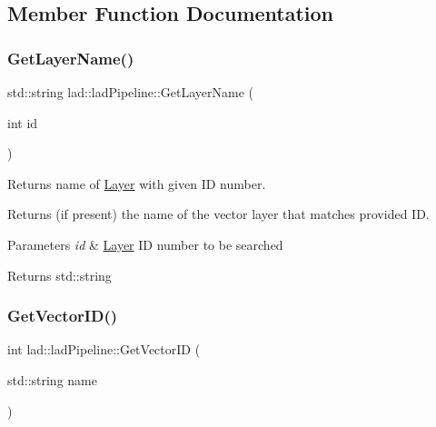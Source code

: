 \subsection{Member Function Documentation}
\mbox{\label{classlad_1_1lad_pipeline_a10c0af216e3004e054d351b9f517408b}} 
\subsubsection{\texorpdfstring{Get\+Layer\+Name()}{GetLayerName()}}
{\footnotesize\ttfamily std\+::string lad\+::lad\+Pipeline\+::\+Get\+Layer\+Name (\begin{DoxyParamCaption}\item[{int}]{id }\end{DoxyParamCaption})}



Returns name of \hyperlink{classlad_1_1_layer}{Layer} with given ID number. 

Returns (if present) the name of the vector layer that matches provided ID.


\begin{DoxyParams}{Parameters}
{\em id} & \hyperlink{classlad_1_1_layer}{Layer} ID number to be searched \\
\hline
\end{DoxyParams}
\begin{DoxyReturn}{Returns}
std\+::string 
\end{DoxyReturn}
\mbox{\label{classlad_1_1lad_pipeline_a6e4748a05ef0346e1912118496931523}} 
\subsubsection{\texorpdfstring{Get\+Vector\+I\+D()}{GetVectorID()}}
{\footnotesize\ttfamily int lad\+::lad\+Pipeline\+::\+Get\+Vector\+ID (\begin{DoxyParamCaption}\item[{std\+::string}]{name }\end{DoxyParamCaption})}



